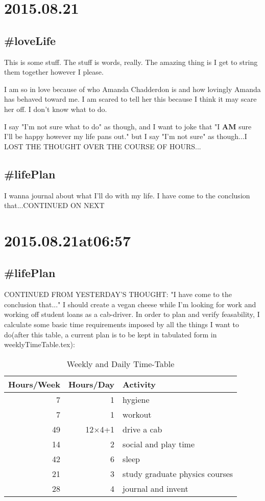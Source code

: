 \section*{2015.08.21}

\subsection*{#loveLife}
This is some stuff. The stuff is words, really. The amazing thing is I get to string them together however I please.

I am so in love because of who Amanda Chadderdon is and how lovingly Amanda has behaved toward me. I am scared to tell her this because I think it may scare her off. I don't know what to do.

I say "I'm not sure what to do" as though, and I want to joke that "I \textbf{AM} sure I'll be happy however my life pans out." but I say "I'm not sure" as though...I LOST THE THOUGHT OVER THE COURSE OF HOURS...

\subsection*{#lifePlan}
I wanna journal about what I'll do with my life. I have come to the conclusion that...CONTINUED ON NEXT

\section*{2015.08.21at06:57}
\subsection*{#lifePlan} CONTINUED FROM YESTERDAY'S THOUGHT:
"I have come to the conclusion that..." I should create a vegan cheese while I'm looking for work and working off student loans as a cab-driver. In order to plan and verify feasability, I calculate some basic time requirements imposed by all the things I want to do(after this table, a current plan is to be kept in tabulated form in weeklyTimeTable.tex):

\begin{table}
\caption{\label{tab:originalWeeklyAndDailyTimeTable}Weekly and Daily Time-Table}
\begin{tabular}{|r|r|l|}
\hline Hours/Week&Hours/Day&Activity\\\hline
7&1&hygiene\\
7&1&workout\\
49&12$\times$4+1&drive a cab\\
14&2&social and play time\\
42&6&sleep\\
21&3&study graduate physics courses\\
28&4&journal and invent\\\hline
\end{tabular}\end{table}

